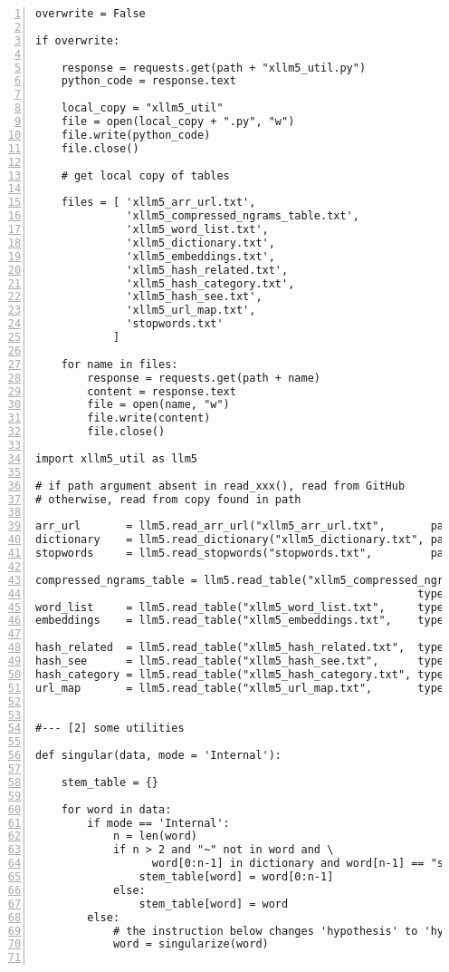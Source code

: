\documentclass[oneside,10pt]{book}
\begin{document}
\begin{lstlisting}[numbers=left]
overwrite = False

if overwrite:

    response = requests.get(path + "xllm5_util.py")
    python_code = response.text

    local_copy = "xllm5_util"
    file = open(local_copy + ".py", "w")
    file.write(python_code)
    file.close()

    # get local copy of tables

    files = [ 'xllm5_arr_url.txt', 
              'xllm5_compressed_ngrams_table.txt',
              'xllm5_word_list.txt',
              'xllm5_dictionary.txt',
              'xllm5_embeddings.txt',
              'xllm5_hash_related.txt',
              'xllm5_hash_category.txt',
              'xllm5_hash_see.txt',
              'xllm5_url_map.txt',
              'stopwords.txt'
            ]

    for name in files:
        response = requests.get(path + name)
        content = response.text
        file = open(name, "w")
        file.write(content)
        file.close()  

import xllm5_util as llm5

# if path argument absent in read_xxx(), read from GitHub
# otherwise, read from copy found in path

arr_url       = llm5.read_arr_url("xllm5_arr_url.txt",       path="")
dictionary    = llm5.read_dictionary("xllm5_dictionary.txt", path="")
stopwords     = llm5.read_stopwords("stopwords.txt",         path="")

compressed_ngrams_table = llm5.read_table("xllm5_compressed_ngrams_table.txt", 
                                                           type="list", path="")
word_list     = llm5.read_table("xllm5_word_list.txt",     type="list", path="")
embeddings    = llm5.read_table("xllm5_embeddings.txt",    type="hash", path="", 
                                                                 format="float") 
hash_related  = llm5.read_table("xllm5_hash_related.txt",  type="hash", path="")
hash_see      = llm5.read_table("xllm5_hash_see.txt",      type="hash", path="")
hash_category = llm5.read_table("xllm5_hash_category.txt", type="hash", path="")
url_map       = llm5.read_table("xllm5_url_map.txt",       type="hash", path="")


#--- [2] some utilities

def singular(data, mode = 'Internal'):

    stem_table = {}

    for word in data:
        if mode == 'Internal': 
            n = len(word)
            if n > 2 and "~" not in word and \
                  word[0:n-1] in dictionary and word[n-1] == "s":
                stem_table[word] = word[0:n-1]
            else:
                stem_table[word] = word
        else:
            # the instruction below changes 'hypothesis' to 'hypothesi'
            word = singularize(word)


\end{lstlisting}
\end{document}
